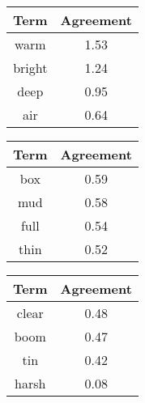 \begin{tabular}{|c|c|}
	\hline
	\bf{Term} & \bf{Agreement} \tabularnewline
	\hline
	\hline
	warm & 1.53 \tabularnewline
	\hline
	bright & 1.24 \tabularnewline
	\hline
	deep & 0.95 \tabularnewline
	\hline
	air & 0.64 \tabularnewline
	\hline
\end{tabular}
\qquad
\begin{tabular}{|c|c|}
	\hline
	\bf{Term} & \bf{Agreement} \tabularnewline
	\hline
	\hline
	box & 0.59 \tabularnewline
	\hline
	mud & 0.58 \tabularnewline
	\hline
	full & 0.54 \tabularnewline
	\hline
	thin & 0.52 \tabularnewline
	\hline
\end{tabular}
\qquad
\begin{tabular}{|c|c|}
	\hline
	\bf{Term} & \bf{Agreement} \tabularnewline
	\hline
	\hline
	clear & 0.48 \tabularnewline
	\hline
	boom & 0.47 \tabularnewline
	\hline
	tin & 0.42 \tabularnewline
	\hline
	harsh & 0.08 \tabularnewline
	\hline
\end{tabular}
